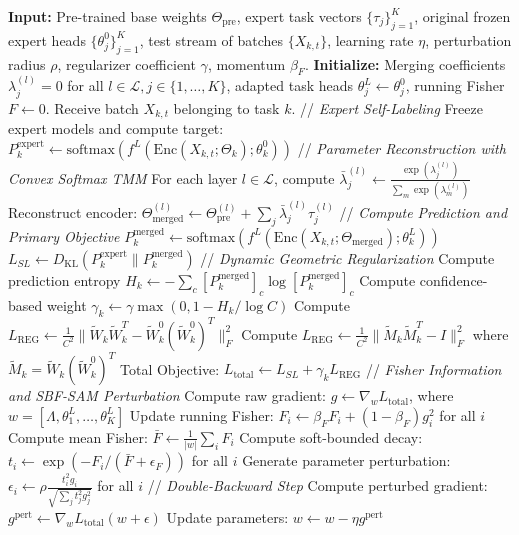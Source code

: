 \documentclass{article}
\begin{document}
\begin{algorithm}[tb]
\caption{Online Test-Time Adaptation via SATA-SBF / SATA-RGP}
\label{alg:tta_loop}
\begin{algorithmic}[1]
\STATE \textbf{Input:} Pre-trained base weights $\Theta_{\text{pre}}$, expert task vectors $\{\tau_j\}_{j=1}^K$, original frozen expert heads $\{\theta^0_j\}_{j=1}^K$, test stream of batches $\{X_{k, t}\}$, learning rate $\eta$, perturbation radius $\rho$, regularizer coefficient $\gamma$, momentum $\beta_F$.
\STATE \textbf{Initialize:} Merging coefficients $\lambda^{(l)}_j = 0$ for all $l \in \mathcal{L}, j \in \{1,\dots,K\}$, adapted task heads $\theta^L_j \leftarrow \theta^0_j$, running Fisher $F \leftarrow 0$.
    \STATE Receive batch $X_{k, t}$ belonging to task $k$.
    \STATE // \textit{Expert Self-Labeling}
    \STATE Freeze expert models and compute target:
    \STATE $P^{\text{expert}}_k \leftarrow \text{softmax}(f^L(\text{Enc}(X_{k, t}; \Theta_k); \theta^0_k))$
    \STATE // \textit{Parameter Reconstruction with Convex Softmax TMM}
    \STATE For each layer $l \in \mathcal{L}$, compute $\bar{\lambda}^{(l)}_j \leftarrow \frac{\exp(\lambda^{(l)}_j)}{\sum_m \exp(\lambda^{(l)}_m)}$
    \STATE Reconstruct encoder: $\Theta^{(l)}_{\text{merged}} \leftarrow \Theta^{(l)}_{\text{pre}} + \sum_j \bar{\lambda}^{(l)}_j \tau^{(l)}_j$
    \STATE // \textit{Compute Prediction and Primary Objective}
    \STATE $P^{\text{merged}}_k \leftarrow \text{softmax}(f^L(\text{Enc}(X_{k, t}; \Theta_{\text{merged}}); \theta^L_k))$
    \STATE $L_{SL} \leftarrow D_{\text{KL}}(P^{\text{expert}}_k \parallel P^{\text{merged}}_k)$
    \STATE // \textit{Dynamic Geometric Regularization}
    \STATE Compute prediction entropy $H_k \leftarrow -\sum_c [P^{\text{merged}}_k]_c \log [P^{\text{merged}}_k]_c$
    \STATE Compute confidence-based weight $\gamma_k \leftarrow \gamma \max(0, 1 - H_k / \log C)$
        \STATE Compute $L_{\text{REG}} \leftarrow \frac{1}{C^2} \| \tilde{W}_k \tilde{W}_k^T - \tilde{W}^0_k (\tilde{W}^0_k)^T \|_F^2$
    \ELSE
        \STATE Compute $L_{\text{REG}} \leftarrow \frac{1}{C^2} \| \tilde{M}_k \tilde{M}_k^T - I \|_F^2$ where $\tilde{M}_k = \tilde{W}_k (\tilde{W}^0_k)^T$
    \ENDIF
    \STATE Total Objective: $L_{\text{total}} \leftarrow L_{SL} + \gamma_k L_{\text{REG}}$
    \STATE // \textit{Fisher Information and SBF-SAM Perturbation}
    \STATE Compute raw gradient: $g \leftarrow \nabla_w L_{\text{total}}$, where $w = [\Lambda, \theta^L_1, \dots, \theta^L_K]$
    \STATE Update running Fisher: $F_i \leftarrow \beta_F F_i + (1 - \beta_F) g_i^2$ for all $i$
    \STATE Compute mean Fisher: $\bar{F} \leftarrow \frac{1}{|w|} \sum_i F_i$
    \STATE Compute soft-bounded decay: $t_i \leftarrow \exp(-F_i / (\bar{F} + \epsilon_F))$ for all $i$
    \STATE Generate parameter perturbation: $\epsilon_i \leftarrow \rho \frac{t_i^2 g_i}{\sqrt{\sum_j t_j^2 g_j^2}}$ for all $i$
    \STATE // \textit{Double-Backward Step}
    \STATE Compute perturbed gradient: $g^{\text{pert}} \leftarrow \nabla_w L_{\text{total}}(w + \epsilon)$
    \STATE Update parameters: $w \leftarrow w - \eta g^{\text{pert}}$
\ENDFOR
\end{algorithmic}
\end{algorithm}
\end{document}
